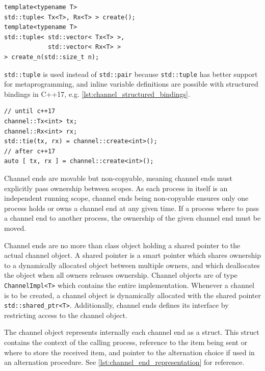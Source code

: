 \begin{lstfloat}
\begin{lstlisting}[caption={Channel create functions.}, label={lst:channel_create_functions}, style={CustomC++}, xleftmargin={4em}]
template<typename T>
std::tuple< Tx<T>, Rx<T> > create();
template<typename T>
std::tuple< std::vector< Tx<T> >, 
            std::vector< Rx<T> >
> create_n(std::size_t n);
\end{lstlisting}
\end{lstfloat}

\texttt{std::tuple} is used instead of \texttt{std::pair} because \texttt{std::tuple} has better support for metaprogramming, and inline variable definitions are possible with structured bindings in C++17, e.g. \cref{lst:channel_structured_bindings}.

\begin{lstfloat}
\begin{lstlisting}[caption={Creating channels with structured bindings.}, label={lst:channel_structured_bindings}, style={CustomC++}, xleftmargin={4em}]
// until c++17
channel::Tx<int> tx;
channel::Rx<int> rx;
std::tie(tx, rx) = channel::create<int>();
// after c++17
auto [ tx, rx ] = channel::create<int>();
\end{lstlisting}
\end{lstfloat}

Channel ends are movable but non\hyp{}copyable, meaning channel ends must explicitly pass ownership between scopes. As each process in itself is an independent running scope, channel ends being non\hyp{}copyable ensures only one process holds or owns a channel end at any given time. If a process where to pass a channel end to another process, the ownership of the given channel end must be moved.

Channel ends are no more than class object holding a shared pointer to the actual channel object. A shared pointer is a smart pointer which shares ownership to a dynamically allocated object between multiple owners, and which deallocates the object when all owners releases ownership. Channel objects are of type \texttt{ChannelImpl<T>} which contains the entire implementation. Whenever a channel is to be created, a channel object is dynamically allocated with the shared pointer \texttt{std::shared\_ptr<T>}. Additionally, channel ends defines its interface by restricting access to the channel object.

The channel object represents internally each channel end as a struct. This struct contains the context of the calling process, reference to the item being sent or where to store the received item, and pointer to the alternation choice if used in an alternation procedure. See \cref{lst:channel_end_representation} for reference. 

